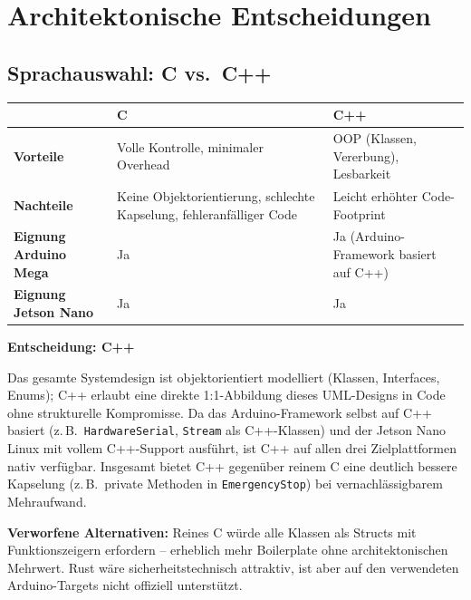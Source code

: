 \section{Architektonische Entscheidungen}
\label{sec:entscheidungen}

\subsection{Sprachauswahl: C vs.\ C++}
\label{sec:sprachauswahl}

\begin{center}
\renewcommand{\arraystretch}{1.4}
\begin{tabular}{>{\bfseries}p{3.5cm} p{5.5cm} p{5.5cm}}
  \toprule
  & \textbf{C} & \textbf{C++} \\
  \midrule
  Vorteile
    & Volle Kontrolle, minimaler Overhead 
    & \ac{OOP} (Klassen, Vererbung), Lesbarkeit \\
  Nachteile
    & Keine Objektorientierung, schlechte Kapselung, fehleranfälliger Code
    & Leicht erhöhter Code-Footprint \\
  Eignung Arduino Mega
    & Ja
    & Ja (Arduino-Framework basiert auf C++) \\
  Eignung Jetson Nano
    & Ja
    & Ja \\
  \bottomrule
\end{tabular}
\end{center}

\textbf{Entscheidung: C++}

Das gesamte Systemdesign ist objektorientiert modelliert
(Klassen, Interfaces, Enums); C++ erlaubt eine direkte 1:1-Abbildung
dieses UML-Designs in Code ohne strukturelle Kompromisse.
Da das Arduino-Framework selbst auf C++ basiert
(z.\,B.\ \texttt{HardwareSerial}, \texttt{Stream} als C++-Klassen)
und der Jetson Nano Linux mit vollem C++-Support ausführt,
ist C++ auf allen drei Zielplattformen nativ verfügbar.
Insgesamt bietet C++ gegenüber reinem C eine deutlich bessere
Kapselung (z.\,B.\ private Methoden in \texttt{EmergencyStop})
bei vernachlässigbarem Mehraufwand.

\textbf{Verworfene Alternativen:}
Reines C würde alle Klassen als Structs mit Funktionszeigern
erfordern – erheblich mehr Boilerplate ohne architektonischen Mehrwert.
Rust wäre sicherheitstechnisch attraktiv, ist aber auf den
verwendeten Arduino-Targets nicht offiziell unterstützt.

